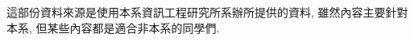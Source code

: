 
這部份資料來源是使用本系資訊工程研究所系辦所提供的資料, 雖然內容主要針對本系, 但某些內容都是適合非本系的同學們.

\ExampleHistoricalNotice



\EndChapter

